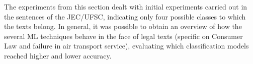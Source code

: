 The experiments from this section dealt with initial experiments carried out in the sentences of the JEC/UFSC, indicating only four possible classes to which the texts belong. In general, it was possible to obtain an overview of how the several ML techniques behave in the face of legal texts (specific on Consumer Law and failure in air transport service), evaluating which classification models reached higher and lower accuracy.

